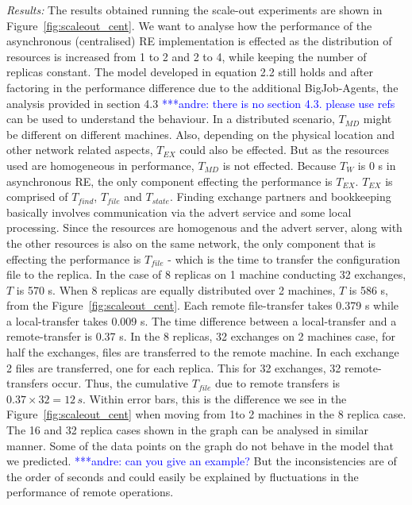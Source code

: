 \documentclass{rspublic}
\newcommand{\jhanote}[1]{ {\textcolor{red} { ***shantenu: #1 }}}
\newcommand{\alnote}[1]{ {\textcolor{blue} { ***andre: #1 }}}
\newcommand{\alnote}[1]{}
\newcommand{\jhanote}[1]{}
\begin{document}
{\it Results:} The results obtained running the scale-out experiments
are shown in Figure~\ref{fig:scaleout_cent}. We want to analyse how
the performance of the asynchronous (centralised) RE implementation is
effected as the distribution of resources is increased from 1 to 2 and
2 to 4, while keeping the number of replicas constant. The model
developed in equation 2.2 still holds and after factoring in the
performance difference due to the additional BigJob-Agents, the
analysis provided in section 4.3\alnote{there is no section
  4.3. please use refs} can be used to understand the behaviour. In a
distributed scenario, $T_{MD}$ might be different on different
machines. Also, depending on the physical location and other network
related aspects, $T_{EX}$ could also be effected.  But as the
resources used are homogeneous in performance, $T_{MD}$ is not
effected. Because $T_W$ is 0 s in asynchronous RE, the only component
effecting the performance is $T_{EX}$. $T_{EX}$ is comprised of
$T_{find}$, $T_{file}$ and $T_{state}$. Finding exchange partners and
bookkeeping basically involves communication via the advert service
and some local processing. Since the resources are homogenous and the
advert server, along with the other resources is also on the same
network, the only component that is effecting the performance is
$T_{file}$ - which is the time to transfer the configuration file to
the replica. In the case of 8 replicas on 1 machine conducting 32
exchanges, $T$ is 570 s. When 8 replicas are equally distributed over
2 machines, $T$ is 586 s, from the
Figure~\ref{fig:scaleout_cent}. Each remote file-transfer takes 0.379
s while a local-transfer takes 0.009 s. The time difference between a
local-transfer and a remote-transfer is 0.37 s. In the 8 replicas, 32
exchanges on 2 machines case, for half the exchanges, files are
transferred to the remote machine. In each exchange 2 files are
transferred, one for each replica. This for 32 exchanges, 32
remote-transfers occur. Thus, the cumulative $T_{file}$ due to remote
transfers is $0.37 \times 32=12\,s$. Within error bars, this is the
difference we see in the Figure~\ref{fig:scaleout_cent} when moving
from 1to 2 machines in the 8 replica case. The 16 and 32 replica cases
shown in the graph can be analysed in similar manner.  Some of the
data points on the graph do not behave in the model that we
predicted.\alnote{can you give an example?}  But the inconsistencies
are of the order of seconds and could easily be explained by
fluctuations in the performance of remote operations.
\end{document}
